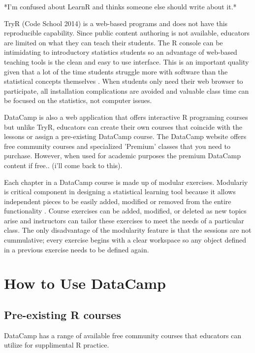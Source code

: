 \documentclass{tise_style}
\begin{document}
*I'm confused about LearnR and thinks someone else should write about it.*

TryR (Code School 2014) is a web-based programs and does not have this reproducible capability. Since public content authoring 
is not available, educators are limited on what they can teach their students. The R console can be intimidating to 
introductory statistics students so an advantage of web-based teaching tools is 
the clean and easy to use interface. This is an important quality given that a lot of the time students struggle more with 
software than the statistical concepts themselves \citep{Hare2017}. When students only need their web browser to participate,
all installation complications are avoided and valuable class time can be focused on the statistics, not computer issues.


DataCamp is also a web application that offers interactive R programing courses but unlike TryR, educators can 
create their own courses that coincide with the lessons or assign a pre-existing DataCamp course. The DataCamp website offers 
free community courses and specialized 'Premium' classes that you need to purchase. However, when used for academic purposes
the premium DataCamp content if free.. (i'll come back to this). 
 
Each chapter in a DataCamp course is made up of modular exercises. Modulariy is critical component in designing a statistical learning tool because it allows independent pieces to be easily added, modified or removed from the entire functionality \citep{Hare2017}. Course exercises can be added, modified, or deleted as new topics arise and instructors can tailor
these exercises to meet the needs of a particular class. The only disadvantage of the modularity feature is that the sessions
are not cummulative; every exercise begins with a clear workspace so any object defined in a previous exercise needs to be 
defined again.  



\section{How to Use DataCamp}

\subsection{Pre-existing R courses}
DataCamp has a range of available free community courses that educators can utilize for supplimental R practice.
\end{document}
